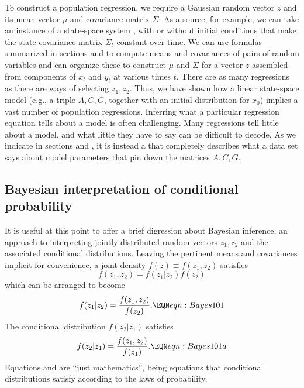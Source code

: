 To construct a  population regression, we require  a Gaussian random vector $z$ and  its mean vector $\mu$
and covariance matrix $\Sigma$. As a source, for example,  we can take an instance of a state-space system ,  with
or without initial conditions that make the state covariance matrix $\Sigma_t$ constant over time. We can use
 formulas summarized in sections  and  to compute means and covariances of  pairs
of random variables and  can organize  these  to construct $\mu$ and $\Sigma$ for a vector $z$ assembled from components of
$x_t$ and $y_t$ at various times $t$.  There are as many  regressions 
  as there are ways of selecting
$z_1, z_2$.   Thus, we have shown how a linear state-space model (e.g., a triple $A, C, G$,
together with an initial distribution for $x_0$) implies a vast number of population
regressions.    Inferring what a particular
regression equation tells about a model is often challenging. Many regressions tell little about a model, and what little they
have to say can be difficult to decode.    As we indicate in sections  and , it is instead  a  that completely describes what a  data set says about  model parameters that pin down the matrices $A, C, G$. %

%

\subsection{Bayesian interpretation of conditional probability}
It is useful at this point to offer a brief digression about Bayesian inference, an approach to interpreting  jointly distributed random vectors $z_1, z_2$ and
the
associated conditional distributions.
Leaving the pertinent means and covariances implicit for convenience, a joint density
$f(z) \equiv f(z_1, z_2)$ %
satisfies
$$ f(z_1, z_2 ) = f(z_1 | z_2)   f(z_2)  $$
which can be arranged to become
$$ f(z_1 | z_2) = {\frac{f(z_1, z_2)}{f(z_2)} } . \EQN eqn:Bayes101 $$
The conditional distribution $f(z_2|z_1)$ satisfies
$$ f(z_2 | z_1) = {\frac{f(z_1, z_2)}{f(z_1)} } . \EQN eqn:Bayes101a $$
Equations  and  are ``just mathematics'', being  equations that   conditional distributions satisfy according to the
laws of probability.

